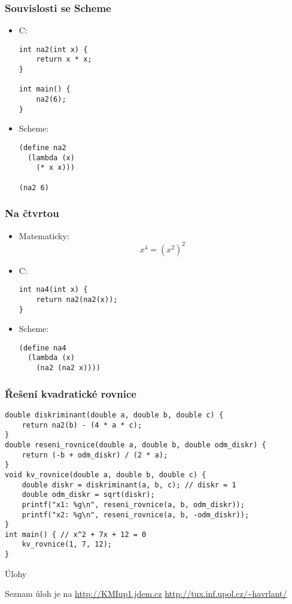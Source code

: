 \documentclass{beamer}
\newenvironment{itemizex}%
  {\large \begin{itemize}%
    \setlength{\itemsep}{8pt}%
    \setlength{\parskip}{8pt}}%
  {\end{itemize}}
\begin{document}
\begin{frame}[t,fragile]\frametitle{Souvislosti se Scheme} 
\begin{itemize}
    \item C:
\begin{verbatim} 
int na2(int x) {
    return x * x;
}

int main() {
    na2(6);
}
\end{verbatim}
    \item Scheme:
\begin{verbatim} 
(define na2
  (lambda (x)
    (* x x)))

(na2 6)
\end{verbatim}
\end{itemize}
\end{frame}


\begin{frame}[t,fragile]\frametitle{Na čtvrtou} 
\begin{itemizex}
    \item Matematicky:
$$
x^4 = (x^2)^2
$$
    \item C:
\begin{verbatim} 
int na4(int x) {
    return na2(na2(x));
}
\end{verbatim}
    \item Scheme:
\begin{verbatim} 
(define na4
  (lambda (x)
    (na2 (na2 x))))
\end{verbatim}
\end{itemizex}
\end{frame}



\begin{frame}[t,fragile]\frametitle{Řešení kvadratické rovnice} 
\begin{verbatim} 
double diskriminant(double a, double b, double c) {
    return na2(b) - (4 * a * c);
}
double reseni_rovnice(double a, double b, double odm_diskr) {
    return (-b + odm_diskr) / (2 * a);
}
void kv_rovnice(double a, double b, double c) {
    double diskr = diskriminant(a, b, c); // diskr = 1
    double odm_diskr = sqrt(diskr); 
    printf("x1: %g\n", reseni_rovnice(a, b, odm_diskr)); 
    printf("x2: %g\n", reseni_rovnice(a, b, -odm_diskr)); 
}
int main() { // x^2 + 7x + 12 = 0
    kv_rovnice(1, 7, 12);  
}
\end{verbatim}
\end{frame}



\begin{frame}[t,fragile]{Úlohy}
\begin{center}
\vskip 1cm
{\Large Seznam úloh je na \url{http://KMIup1.jdem.cz}}
\vskip 2cm
\url{http://tux.inf.upol.cz/~havrlant/}
\end{center}
\end{frame}
\end{document}
